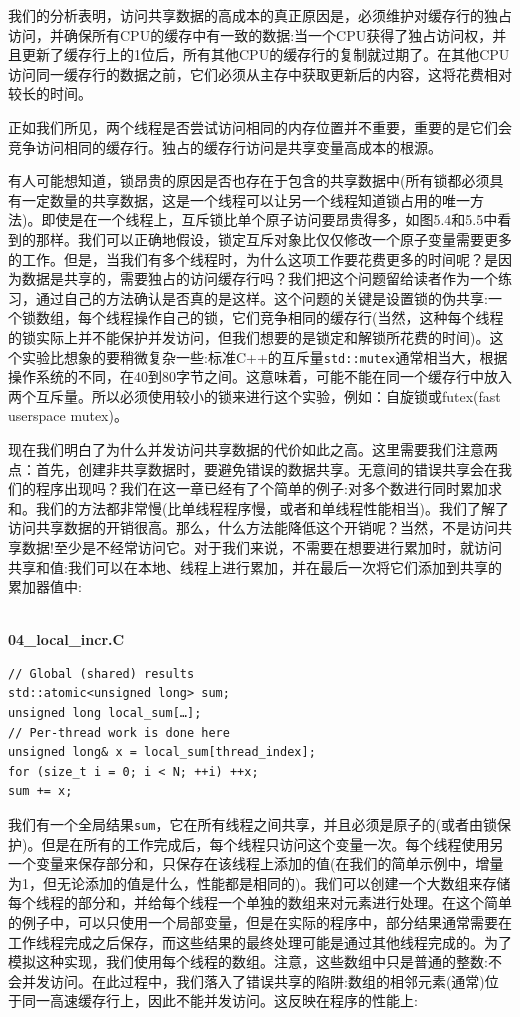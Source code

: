 我们的分析表明，访问共享数据的高成本的真正原因是，必须维护对缓存行的独占访问，并确保所有CPU的缓存中有一致的数据:当一个CPU获得了独占访问权，并且更新了缓存行上的1位后，所有其他CPU的缓存行的复制就过期了。在其他CPU访问同一缓存行的数据之前，它们必须从主存中获取更新后的内容，这将花费相对较长的时间。

正如我们所见，两个线程是否尝试访问相同的内存位置并不重要，重要的是它们会竞争访问相同的缓存行。独占的缓存行访问是共享变量高成本的根源。

有人可能想知道，锁昂贵的原因是否也存在于包含的共享数据中(所有锁都必须具有一定数量的共享数据，这是一个线程可以让另一个线程知道锁占用的唯一方法)。即使是在一个线程上，互斥锁比单个原子访问要昂贵得多，如图5.4和5.5中看到的那样。我们可以正确地假设，锁定互斥对象比仅仅修改一个原子变量需要更多的工作。但是，当我们有多个线程时，为什么这项工作要花费更多的时间呢？是因为数据是共享的，需要独占的访问缓存行吗？我们把这个问题留给读者作为一个练习，通过自己的方法确认是否真的是这样。这个问题的关键是设置锁的伪共享:一个锁数组，每个线程操作自己的锁，它们竞争相同的缓存行(当然，这种每个线程的锁实际上并不能保护并发访问，但我们想要的是锁定和解锁所花费的时间)。这个实验比想象的要稍微复杂一些:标准C++的互斥量\texttt{std::mutex}通常相当大，根据操作系统的不同，在40到80字节之间。这意味着，可能不能在同一个缓存行中放入两个互斥量。所以必须使用较小的锁来进行这个实验，例如：自旋锁或futex(fast userspace mutex)。

现在我们明白了为什么并发访问共享数据的代价如此之高。这里需要我们注意两点：首先，创建非共享数据时，要避免错误的数据共享。无意间的错误共享会在我们的程序出现吗？我们在这一章已经有了个简单的例子:对多个数进行同时累加求和。我们的方法都非常慢(比单线程程序慢，或者和单线程性能相当)。我们了解了访问共享数据的开销很高。那么，什么方法能降低这个开销呢？当然，不是访问共享数据!至少是不经常访问它。对于我们来说，不需要在想要进行累加时，就访问共享和值:我们可以在本地、线程上进行累加，并在最后一次将它们添加到共享的累加器值中:

\hspace*{\fill} \\ %
\noindent
\textbf{04\_local\_incr.C}
\begin{lstlisting}[style=styleCXX]
// Global (shared) results
std::atomic<unsigned long> sum;
unsigned long local_sum[…];
// Per-thread work is done here
unsigned long& x = local_sum[thread_index];
for (size_t i = 0; i < N; ++i) ++x;
sum += x;
\end{lstlisting}

我们有一个全局结果\texttt{sum}，它在所有线程之间共享，并且必须是原子的(或者由锁保护)。但是在所有的工作完成后，每个线程只访问这个变量一次。每个线程使用另一个变量来保存部分和，只保存在该线程上添加的值(在我们的简单示例中，增量为1，但无论添加的值是什么，性能都是相同的)。我们可以创建一个大数组来存储每个线程的部分和，并给每个线程一个单独的数组来对元素进行处理。在这个简单的例子中，可以只使用一个局部变量，但是在实际的程序中，部分结果通常需要在工作线程完成之后保存，而这些结果的最终处理可能是通过其他线程完成的。为了模拟这种实现，我们使用每个线程的数组。注意，这些数组中只是普通的整数:不会并发访问。在此过程中，我们落入了错误共享的陷阱:数组的相邻元素(通常)位于同一高速缓存行上，因此不能并发访问。这反映在程序的性能上:

